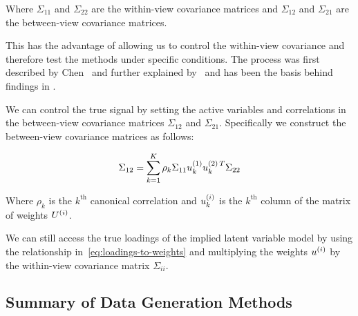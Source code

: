 Where $\Sigma_{11}$ and $\Sigma_{22}$ are the within-view covariance matrices and $\Sigma_{12}$ and $\Sigma_{21}$ are the between-view covariance matrices.

This has the advantage of allowing us to control the within-view covariance and therefore test the methods under specific conditions.
The process was first described by Chen~\citep{chen2013sparse} and further explained by~\citep{suo2017sparse} and has been the basis behind findings in \citet{helmer2020stability,matkovivc2023static}.

We can control the true signal by setting the active variables and correlations in the between-view covariance matrices $\Sigma_{12}$ and $\Sigma_{21}$.
Specifically we construct the between-view covariance matrices as follows:

\begin{align}
    \Sigma_{12}=\sum_{k=1}^{K}\rho_k\Sigma_{11}u^{(1)}_{k}u^{(2)\,T}_k\Sigma_{22}
\end{align}

Where $\rho_k$ is the $k^{\text{th}}$ canonical correlation and $u^{(i)}_k$ is the $k^{\text{th}}$ column of the matrix of weights $U^{(i)}$.

We can still access the true \gls{loadings} of the implied latent variable model by using the relationship in~\ref{eq:loadings-to-weights} and multiplying the weights $u^{(i)}$ by the within-view covariance matrix $\Sigma_{ii}$.

\subsection{Summary of Data Generation Methods}


